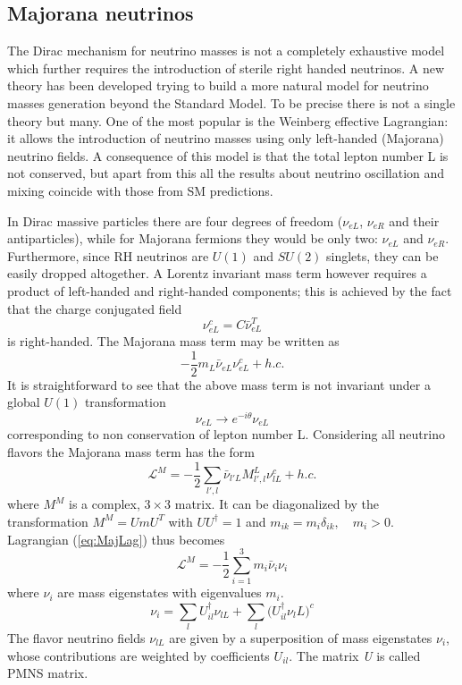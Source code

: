 \documentclass{subnucbo}
\begin{document}
\subsection{Majorana neutrinos}
The Dirac mechanism for neutrino masses is not a completely exhaustive model which further requires the introduction of sterile %
right handed neutrinos.
A new theory has been developed trying to build a more natural model for neutrino masses generation beyond the Standard Model. To be precise there is not a single theory but many. One of the most popular is the Weinberg effective Lagrangian: it allows the introduction of neutrino masses using only left-handed (Majorana) neutrino fields.
A consequence of this model is that the total lepton number L is not conserved, but apart from this all the results about neutrino oscillation and mixing coincide with those from SM predictions.

In Dirac massive particles there are four degrees of freedom ($\nu_{eL}$, $\nu_{eR}$ and their antiparticles), while for Majorana fermions they would be only two: $\nu_{eL}$ and $\nu_{eR}$. Furthermore, since RH neutrinos are $U(1)$ and $SU(2)$ singlets, they can be easily dropped altogether.
A Lorentz invariant mass term however requires a product of left-handed and right-handed components; this is achieved by the fact that
the charge conjugated field
\begin{equation}
\nu_{eL}^c=C\bar{\nu}_{eL}^T
\end{equation}
is right-handed. The Majorana mass term may be written as
\begin{equation}
-\frac{1}{2}m_L\bar{\nu}_{eL}\nu_{eL}^c+h.c.
\end{equation}
It is straightforward to see that the above mass term is not invariant under a global $U(1)$ transformation
\begin{equation}
\nu_{eL}\rightarrow e^{-i\theta}\nu_{eL}
\end{equation}
corresponding to non conservation  of lepton number L.
Considering all neutrino flavors the Majorana mass term has the form
\begin{equation}
\label{eq:MajLag}
\mathcal{L}^M=-\frac{1}{2}\sum_{l',l}\bar{\nu}_{l'L}M_{l',l}^L\nu_{lL}^c+h.c.
\end{equation}
where $M^M$ is a complex, $3\times3$ matrix. It can be diagonalized by the transformation $M^M=UmU^T$ with $UU^{\dagger}=1$ and $m_{ik}=m_i\delta_{ik},\quad m_i>0$.
Lagrangian (\ref{eq:MajLag}) thus becomes
\begin{equation}
\mathcal{L}^M=-\frac{1}{2}\sum_{i=1}^3m_i\bar{\nu}_i\nu_i
\end{equation}
where $\nu_i$ are mass eigenstates with eigenvalues $m_i$.
\begin{equation}
\nu_i=\sum_lU_{il}^{\dagger}\nu_{lL}+\sum_l\bigl(U_{il}^{\dagger}\nu_lL\bigr)^c
\end{equation}
The flavor neutrino fields $\nu_{lL}$ are given by a superposition of mass eigenstates $\nu_i$, whose contributions are weighted by coefficients $U_{il}$. The matrix \emph{U} is called PMNS matrix.
\end{document}
